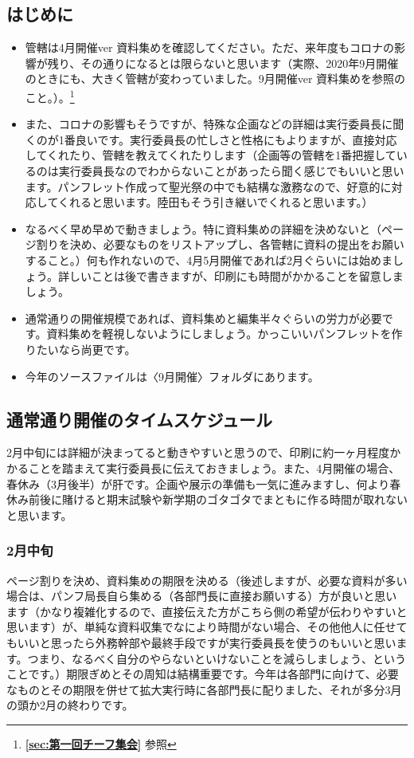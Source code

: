 \documentclass[dvipdfmx,jb5]{jarticle}
\begin{document}
\subsection{はじめに}
 \begin{itemize}
\item 管轄は4月開催ver 資料集めを確認してください。ただ、来年度もコロナの影響が残り、その通りになるとは限らないと思います（実際、2020年9月開催のときにも、大きく管轄が変わっていました。9月開催ver 資料集めを参照のこと。）。\footnote{{\bf \ref{sec:第一回チーフ集会}} 参照}
\item また、コロナの影響もそうですが、特殊な企画などの詳細は実行委員長に聞くのが1番良いです。実行委員長の忙しさと性格にもよりますが、直接対応してくれたり、管轄を教えてくれたりします（企画等の管轄を1番把握しているのは実行委員長なのでわからないことがあったら聞く感じでもいいと思います。パンフレット作成って聖光祭の中でも結構な激務なので、好意的に対応してくれると思います。陸田もそう引き継いでくれると思います。）
\item なるべく早め早めで動きましょう。特に資料集めの詳細を決めないと（ページ割りを決め、必要なものをリストアップし、各管轄に資料の提出をお願いすること。）何も作れないので、4月5月開催であれば2月ぐらいには始めましょう。詳しいことは後で書きますが、印刷にも時間がかかることを留意しましょう。
\item 通常通りの開催規模であれば、資料集めと編集半々ぐらいの労力が必要です。資料集めを軽視しないようにしましょう。かっこいいパンフレットを作りたいなら尚更です。
\item 今年のソースファイルは〈9月開催〉フォルダにあります。
\end{itemize}

\subsection{通常通り開催のタイムスケジュール}
2月中旬には詳細が決まってると動きやすいと思うので、印刷に約一ヶ月程度かかることを踏まえて実行委員長に伝えておきましょう。また、4月開催の場合、春休み（3月後半）が肝です。企画や展示の準備も一気に進みますし、何より春休み前後に賭けると期末試験や新学期のゴタゴタでまともに作る時間が取れないと思います。

\subsubsection{2月中旬}
ページ割りを決め、資料集めの期限を決める（後述しますが、必要な資料が多い場合は、パンフ局長自ら集める（各部門長に直接お願いする）方が良いと思います（かなり複雑化するので、直接伝えた方がこちら側の希望が伝わりやすいと思います）が、単純な資料収集でなにより時間がない場合、その他他人に任せてもいいと思ったら外務幹部や最終手段ですが実行委員長を使うのもいいと思います。つまり、なるべく自分のやらないといけないことを減らしましょう、ということです。）期限ぎめとその周知は結構重要です。今年は各部門に向けて、必要なものとその期限を併せて拡大実行時に各部門長に配りました、それが多分3月の頭か2月の終わりです。
\end{document}

